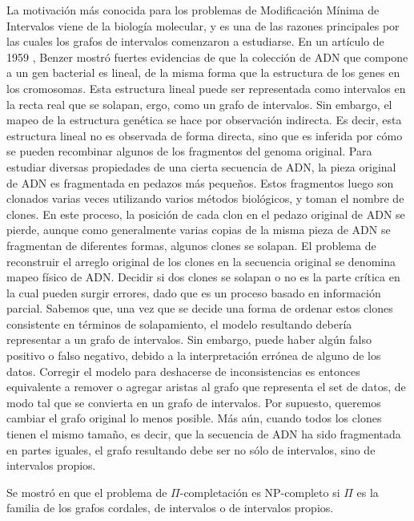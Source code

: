 \documentclass[12pt]{book}
\theoremstyle{plain}
\theoremstyle{remark}
\begin{document}
La motivación más conocida para los problemas de Modificación Mínima de Intervalos viene de la biología molecular, y es una de las razones principales por las cuales los grafos de intervalos comenzaron a estudiarse. En un artículo de 1959 \cite{B59}, Benzer mostró fuertes evidencias de que la colección de ADN que compone a un gen bacterial es lineal, de la misma forma que la estructura de los genes en los cromosomas. Esta estructura lineal puede ser representada como intervalos en la recta real que se solapan, ergo, como un grafo de intervalos. Sin embargo, el mapeo de la estructura genética se hace por observación indirecta. Es decir, esta estructura lineal no es observada de forma directa, sino que es inferida por cómo se pueden recombinar algunos de los fragmentos del genoma original.  
Para estudiar diversas propiedades de una cierta secuencia de ADN, la pieza original de ADN es fragmentada en pedazos más pequeños. Estos fragmentos luego son clonados varias veces utilizando varios métodos biológicos, y toman el nombre de clones. En este proceso, la posición de cada clon en el pedazo original de ADN se pierde, aunque como generalmente varias copias de la misma pieza de ADN se fragmentan de diferentes formas, algunos clones se solapan. El problema de reconstruir el arreglo original de los clones en la secuencia original se denomina mapeo físico de ADN. Decidir si dos clones se solapan o no es la parte crítica en la cual pueden surgir errores, dado que es un proceso basado en información parcial. 
Sabemos que, una vez que se decide una forma de ordenar estos clones consistente en términos de solapamiento, el modelo resultando debería representar a un grafo de intervalos. Sin embargo, puede haber algún falso positivo o falso negativo, debido a la interpretación errónea de alguno de los datos. Corregir el modelo para deshacerse de inconsistencias es entonces equivalente a remover o agregar aristas al grafo que representa el set de datos, de modo tal que se convierta en un grafo de intervalos. Por supuesto, queremos cambiar el grafo original lo menos posible. Más aún, cuando todos los clones tienen el mismo tamaño, es decir, que la secuencia de ADN ha sido fragmentada en partes iguales, el grafo resultando debe ser no sólo de intervalos, sino de intervalos propios. 

Se mostró en \cite{KF79, Y81, GJ79, GGKS95} que el problema de $\Pi$-completación es NP-completo si $\Pi$ es la familia de los grafos cordales, de intervalos o de intervalos propios. 


\end{document}

